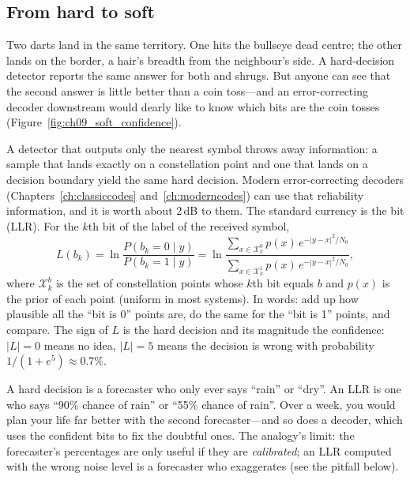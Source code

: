 \subsection{From hard to soft}

Two darts land in the same territory. One hits the bullseye dead centre; the other lands on the
border, a hair's breadth from the neighbour's side. A hard-decision detector reports the same
answer for both and shrugs. But anyone can see that the second answer is little better than a
coin toss---and an error-correcting decoder downstream would dearly like to know which bits are
the coin tosses (Figure~\ref{fig:ch09_soft_confidence}).


A detector that outputs only the nearest symbol throws away information: a sample that lands
exactly on a constellation point and one that lands on a decision boundary yield the same hard
decision. Modern error-correcting decoders (Chapters~\ref{ch:classiccodes}
and~\ref{ch:moderncodes}) can use that reliability information, and it is worth about 2\,dB to
them. The standard currency is the bit  (LLR). For the $k$th bit of the
label of the received symbol,
\begin{equation}
L(b_k)=\ln\frac{P(b_k=0\mid y)}{P(b_k=1\mid y)}
=\ln\frac{\sum_{x\in\mathcal X_k^0}p(x)\,e^{-|y-x|^2/N_0}}{\sum_{x\in\mathcal X_k^1}p(x)\,e^{-|y-x|^2/N_0}},
\label{eq:ch09:llr}
\end{equation}
where $\mathcal X_k^b$ is the set of constellation points whose $k$th bit equals $b$ and $p(x)$ is
the prior of each point (uniform in most systems). In words: add up how plausible all the
``bit is 0'' points are, do the same for the ``bit is 1'' points, and compare. The sign of $L$ is
the hard decision and its magnitude the confidence: $|L|=0$ means no idea, $|L|=5$ means the
decision is wrong with probability $1/(1+e^5)\approx0.7\%$.

\begin{analogy}
A hard decision is a forecaster who only ever says ``rain'' or ``dry''. An LLR is one who says
``90\% chance of rain'' or ``55\% chance of rain''. Over a week, you would plan your life far
better with the second forecaster---and so does a decoder, which uses the confident bits to fix
the doubtful ones. The analogy's limit: the forecaster's percentages are only useful if they are
\emph{calibrated}; an LLR computed with the wrong noise level is a forecaster who exaggerates
(see the pitfall below).
\end{analogy}

